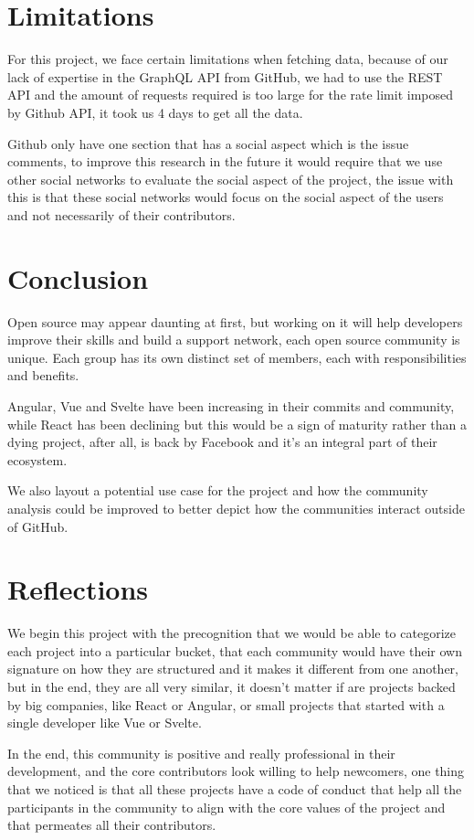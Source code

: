 \section{Limitations}
For this project, we face certain limitations when fetching data, because of our lack of expertise in the GraphQL API from GitHub, we had to use the REST API and the amount of requests required is too large for the rate limit imposed by Github API, it took us 4 days to get all the data. 

Github only have one section that has a social aspect which is the issue comments, to improve this research in the future it would require that we use other social networks to evaluate the social aspect of the project, the issue with this is that these social networks would focus on the social aspect of the users and not necessarily of their contributors.

\section{Conclusion}
Open source may appear daunting at first, but working on it will help developers improve their skills and build a support network, each open source community is unique. Each group has its own distinct set of members, each with responsibilities and benefits.

Angular, Vue and Svelte have been increasing in their commits and community, while React has been declining but this would be a sign of maturity rather than a dying project, after all, is back by Facebook and it's an integral part of their ecosystem.

We also layout a potential use case for the project and how the community analysis could be improved to better depict how the communities interact outside of GitHub.

\pagebreak

\section{Reflections}
We begin this project with the precognition that we would be able to categorize each project into a particular bucket, that each community would have their own signature on how they are structured and it makes it different from one another, but in the end, they are all very similar, it doesn't matter if are projects backed by big companies, like React or Angular, or small projects that started with a single developer like Vue or Svelte.

In the end, this community is positive and really professional in their development, and the core contributors look willing to help newcomers, one thing that we noticed is that all these projects have a code of conduct that help all the participants in the community to align with the core values of the project and that permeates all their contributors.

\pagebreak
